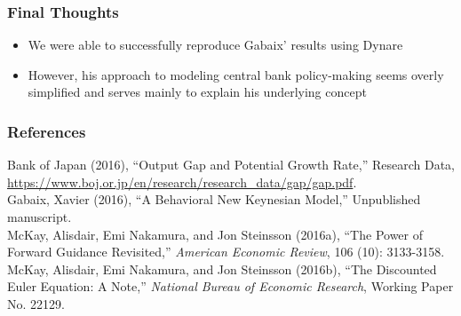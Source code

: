 \documentclass{beamer}
\begin{document}

\begin{frame}
	\frametitle{Final Thoughts}
	\begin{itemize}
		\item We were able to successfully reproduce Gabaix' results using Dynare
		\vspace{8pt}
		\item However, his approach to modeling central bank policy-making seems overly simplified and serves mainly to explain his underlying concept 
	\end{itemize}
\end{frame}


\begin{frame}
	\frametitle{References}
	\begin{flushleft}
		\footnotesize
		Bank of Japan (2016), ``Output Gap and Potential Growth Rate,'' Research Data, \url{https://www.boj.or.jp/en/research/research\_data/gap/gap.pdf}.\\
		\vspace{7pt}
		Gabaix, Xavier (2016), ``A Behavioral New Keynesian Model,'' Unpublished manuscript.\\
		\vspace{7pt}
		McKay, Alisdair, Emi Nakamura, and Jon Steinsson (2016a), ``The Power of Forward Guidance Revisited,'' \textit{American Economic Review}, 106 (10): 3133-3158.\\
		\vspace{7pt}
		McKay, Alisdair, Emi Nakamura, and Jon Steinsson (2016b), ``The Discounted Euler Equation: A Note,'' \textit{National Bureau of Economic Research}, Working Paper No. 22129.
	\end{flushleft}
\end{frame}

\end{document}
